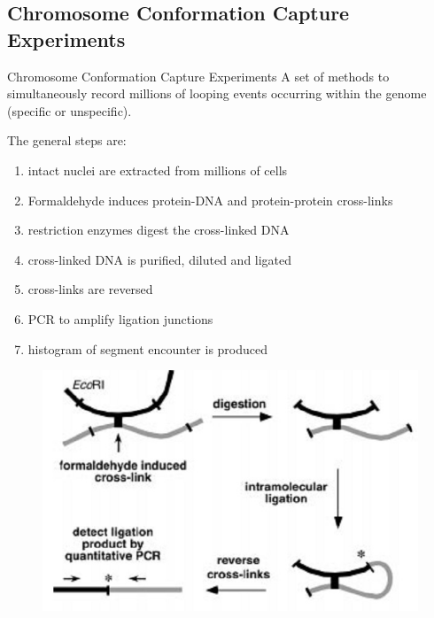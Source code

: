 \documentclass[8pt]{beamer}
\begin{document}
\subsection{Chromosome Conformation Capture Experiments}\label{subsection_chromosomeConformationCaptureExperiments}
\begin{frame}{Chromosome Conformation Capture Experiments}
A set of methods to simultaneously record millions of looping events occurring within the genome (specific or unspecific). 

The general steps are:
\begin{enumerate}
\item intact nuclei are extracted from millions of cells 
\item Formaldehyde induces protein-DNA and protein-protein cross-links
\item restriction enzymes digest the cross-linked DNA
\item cross-linked DNA is purified, diluted and ligated
\item cross-links are reversed
\item PCR to amplify ligation junctions
\item histogram of segment encounter is produced
\end{enumerate}
\begin{figure}[H]
\includegraphics[scale=0.3]{3Cschematic}
\end{figure}
\end{frame}
\end{document}
